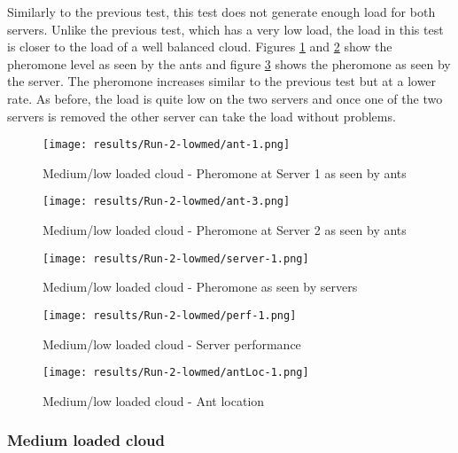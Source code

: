 Similarly to the previous test, this test does not generate enough load for both servers. Unlike the previous test, which has a very low load, the load in this test is closer to the load of a well balanced cloud. Figures \ref{fig:2serv-ant1-medlow} and \ref{fig:2serv-ant3-medlow} show the pheromone level as seen by the ants and figure \ref{fig:2serv-pher-medlow} shows the pheromone as seen by the server. The pheromone increases similar to the previous test but at a lower rate. As before, the load is quite low on the two servers and once one of the two servers is removed the other server can take the load without problems.

\begin{figure}[!ht]
	\centering
		\texttt{[image: results/Run-2-lowmed/ant-1.png]}
	\caption{Medium/low loaded cloud - Pheromone at Server 1 as seen by ants}
	\label{fig:2serv-ant1-medlow}
\end{figure}

\begin{figure}
	\centering
		\texttt{[image: results/Run-2-lowmed/ant-3.png]}
	\caption{Medium/low loaded cloud - Pheromone at Server 2 as seen by ants}
	\label{fig:2serv-ant3-medlow}
\end{figure}

\begin{figure}
	\centering
		\texttt{[image: results/Run-2-lowmed/server-1.png]}
	\caption{Medium/low loaded cloud - Pheromone as seen by servers}
	\label{fig:2serv-pher-medlow}
\end{figure}

\begin{figure}
	\centering
		\texttt{[image: results/Run-2-lowmed/perf-1.png]}
	\caption{Medium/low loaded cloud - Server performance}
	\label{fig:2serv-perf-medlow}
\end{figure}

\begin{figure}
	\centering
		\texttt{[image: results/Run-2-lowmed/antLoc-1.png]}
	\caption{Medium/low loaded cloud - Ant location}
	\label{fig:2serv-antloc-medlow}
\end{figure}

\subsubsection{Medium loaded cloud}

